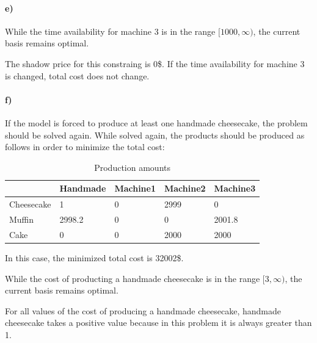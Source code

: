 \documentclass{article}
\begin{document}
\paragraph*{e)}
While the time availability for machine 3 is in the range $[1000, \infty)$, the current basis remains optimal.

The shadow price for this constraing is 0\$.
If the time availability for machine 3 is changed, total cost does not change.

\paragraph*{f)}
If the model is forced to produce at least one handmade cheesecake, the problem should be solved again.
While solved again, the products should be produced as follows in order to minimize the total cost:
\begin{table}[H]
    \centering
    \caption{Production amounts}
    \begin{tabular}{|l|l|l|l|l|}
    \hline
               & Handmade & Machine1 & Machine2 & Machine3 \\ \hline
    Cheesecake & 1     & 0        & 2999     & 0        \\ \hline
    Muffin     & 2998.2     & 0        & 0        & 2001.8     \\ \hline
    Cake       & 0        & 0        & 2000        & 2000     \\ \hline
    \end{tabular}
\end{table}

In this case, the minimized total cost is 32002\$.

While the cost of producting a handmade cheesecake is in the range $[3, \infty)$, the current basis remains optimal.

For all values of the cost of producing a handmade cheesecake, handmade cheesecake takes a positive value because in this problem it is always greater than 1.
\end{document}
